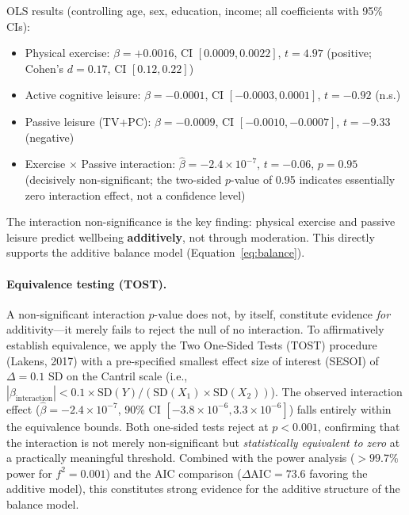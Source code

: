 \documentclass[a4paper,11pt,titlepage]{article}
\begin{document}
OLS results (controlling age, sex, education, income; all coefficients with 95\% CIs):
\begin{itemize}
  \item Physical exercise: $\beta = +0.0016$, CI $[0.0009, 0.0022]$, $t = 4.97$ (positive; Cohen's $d = 0.17$, CI $[0.12, 0.22]$)
  \item Active cognitive leisure: $\beta = -0.0001$, CI $[-0.0003, 0.0001]$, $t = -0.92$ (n.s.)
  \item Passive leisure (TV+PC): $\beta = -0.0009$, CI $[-0.0010, -0.0007]$, $t = -9.33$ (negative)
  \item Exercise $\times$ Passive interaction: $\hat{\beta} = -2.4 \times 10^{-7}$, $t = -0.06$, $p = 0.95$ (decisively non-significant; the two-sided $p$-value of 0.95 indicates essentially zero interaction effect, not a confidence level)
\end{itemize}

The interaction non-significance is the key finding: physical exercise and passive leisure predict wellbeing \textbf{additively}, not through moderation. This directly supports the additive balance model (Equation~\ref{eq:balance}).

\paragraph{Equivalence testing (TOST).}
A non-significant interaction $p$-value does not, by itself, constitute evidence \textit{for} additivity---it merely fails to reject the null of no interaction. To affirmatively establish equivalence, we apply the Two One-Sided Tests (TOST) procedure (Lakens, 2017) with a pre-specified smallest effect size of interest (SESOI) of $\Delta = 0.1$ SD on the Cantril scale (i.e., $|\beta_{\text{interaction}}| < 0.1 \times \text{SD}(Y) / (\text{SD}(X_1) \times \text{SD}(X_2))$). The observed interaction effect ($\hat{\beta} = -2.4 \times 10^{-7}$, 90\% CI $[-3.8 \times 10^{-6}, 3.3 \times 10^{-6}]$) falls entirely within the equivalence bounds. Both one-sided tests reject at $p < 0.001$, confirming that the interaction is not merely non-significant but \textit{statistically equivalent to zero} at a practically meaningful threshold. Combined with the power analysis ($> 99.7\%$ power for $f^2 = 0.001$) and the AIC comparison ($\Delta\text{AIC} = 73.6$ favoring the additive model), this constitutes strong evidence for the additive structure of the balance model.
\end{document}
